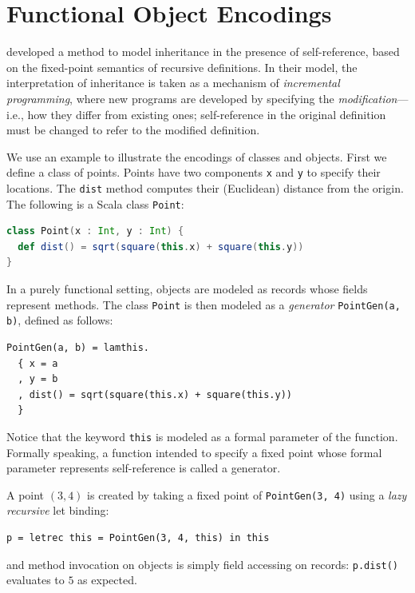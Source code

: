 \section{Functional Object Encodings}

\label{sec:bg:object}

\citet{cook1989denotational} developed a method to model inheritance in the
presence of self-reference, based on the fixed-point semantics of recursive
definitions. In their model, the interpretation of inheritance is taken as a
mechanism of \emph{incremental programming}, where new programs are developed
by specifying the \emph{modification}---i.e., how they differ from existing
ones; self-reference in the original definition must be changed to refer to the
modified definition.

We use an example to illustrate the encodings of classes and objects. First we
define a class of points. Points have two components \lstinline{x} and
\lstinline{y} to specify their locations. The \lstinline{dist} method computes
their (Euclidean) distance from the origin. The following is a Scala class
\lstinline{Point}:
\begin{lstlisting}[language=Scala]
class Point(x : Int, y : Int) {
  def dist() = sqrt(square(this.x) + square(this.y))
}
\end{lstlisting}

In a purely functional setting, objects are modeled as records whose fields
represent methods. The class \lstinline{Point} is then modeled as a
\emph{generator} \lstinline{PointGen(a, b)}, defined as follows:
\begin{lstlisting}[language=simple]
PointGen(a, b) = lamthis.
  { x = a
  , y = b
  , dist() = sqrt(square(this.x) + square(this.y))
  }
\end{lstlisting}
Notice that the keyword \lstinline{this} is modeled as a formal parameter of the
function. %
Formally speaking, a function intended to specify a fixed point whose formal
parameter represents self-reference is called a generator.

A point $(3, 4)$ is created by taking a fixed point of \lstinline{PointGen(3, 4)} using a
\emph{lazy recursive} let binding:
\begin{lstlisting}[language=simple]
p = letrec this = PointGen(3, 4, this) in this
\end{lstlisting}
and method invocation on objects is simply field accessing on records:
\lstinline{p.dist()} evaluates to $5$ as expected.

